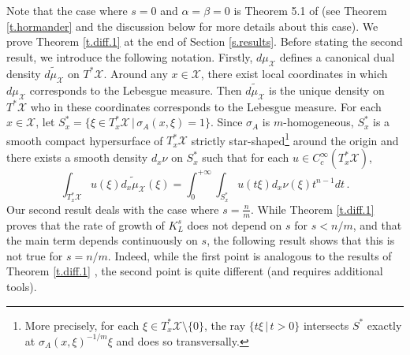 \documentclass[10pt,twoside]{article}
\newcommand{\man}{\mathcal{X}}
\numberwithin{theorem}{section}
\begin{document}
Note that the case where $s=0$ and $\alpha=\beta=0$ is Theorem 5.1 of \cite{ho68} (see Theorem \ref{t.hormander} and the discussion below for more details about this case). We prove Theorem \ref{t.diff.1} at the end of Section \ref{s.results}. Before stating the second result, we introduce the following notation. Firstly, $d\mu_\man$ defines a canonical dual density $\widetilde{d\mu_\man}$ on $T^*\man$. Around any $x\in\man$, there exist local coordinates in which $d\mu_\man$ corresponds to the Lebesgue measure. Then $\widetilde{d\mu_\man}$ is the unique density on $T^*\man$ who in these coordinates corresponds to the Lebesgue measure. For each $x\in\man$, let $S^*_x=\{\xi\in T^*_x\man\, |\, \sigma_A(x,\xi)=1\}$. Since $\sigma_A$ is $m$-homogeneous, $S^*_x$ is a smooth compact hypersurface of $T^*_x\man$ strictly star-shaped\footnote{More precisely, for each $\xi\in T^*_x\man\setminus\{0\}$, the ray $\{t\xi\, |\, t>0\}$ intersects $S^*$ exactly at $\sigma_A(x,\xi)^{-1/m}\xi$ and does so transversally.} around the origin and there exists a smooth density $d_x\nu$ on $S^*_x$ such that for each $u\in C^\infty_c(T^*_x\man)$,
\begin{equation}\label{e.nu}
\int_{T^*_x\man} u(\xi)\widetilde{d_x\mu_\man}(\xi)=\int_0^{+\infty}\int_{S^*_x} u(t\xi) d_x\nu(\xi) t^{n-1}dt\, .
\end{equation}
Our second result deals with the case where $s=\frac{n}{m}$. While Theorem \ref{t.diff.1} proves that the rate of growth of $K_L^s$ does not depend on $s$ for $s<n/m$, and that the main term depends continuously on $s$, the following result shows that this is not true for $s=n/m$. Indeed, while the first point is analogous to the results of Theorem \ref{t.diff.1}
, the second point is quite different (and requires additional tools).
\end{document}
